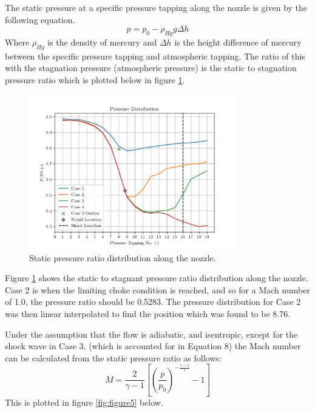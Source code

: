 \documentclass[8pt]{article}
\begin{document}
The static pressure at a specific pressure tapping along the nozzle is given by the following equation.
\begin{equation}
    p = p_0 - \rho_{Hg} g \Delta h
\end{equation}
Where $\rho_{Hg}$ is the density of mercury and $\Delta h$ is the height difference of mercury between the specific pressure tapping and atmospheric tapping.
The ratio of this with the stagnation pressure (atmospheric pressure) is the static to stagnation pressure ratio which is plotted below in figure \ref{fig:figure4}.

\begin{figure}[H]
    \centering
    \includegraphics[width=0.8\textwidth]{pressure_ratio_distribution_corrected.png}
    \caption{Static pressure ratio distribution along the nozzle.}
    \label{fig:figure4}
\end{figure}

Figure \ref{fig:figure4} shows the static to stagnant pressure ratio distribution along the nozzle.
Case 2 is when the limiting choke condition is reached, and so for a Mach number of 1.0, the pressure ratio should be 0.5283.
The pressure distribution for Case 2 was then linear interpolated to find the position which was found to be 8.76.

\hfill

Under the assumption that the flow is adiabatic, and isentropic, except for the shock wave in Case 3, (which is accounted for in Equation 8) the Mach number can be calculated from the static pressure ratio as follows:
\begin{equation}
    M = \frac{2}{\gamma - 1} \left[ \left( \frac{p}{p_0} \right) ^ {-\frac{\gamma - 1}{\gamma}} - 1 \right]
\end{equation}
This is plotted in figure \ref{fig:figure5} below.
\end{document}
